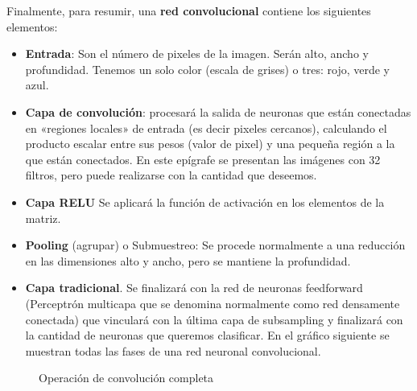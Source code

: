 \documentclass[
  a4paper,
  DIV=11,
  numbers=noendperiod]{scrreprt}
\providecommand{\tightlist}{%
  \setlength{\itemsep}{0pt}\setlength{\parskip}{0pt}}\usepackage{longtable,booktabs,array}
\begin{document}
Finalmente, para resumir, una \textbf{red convolucional} contiene los
siguientes elementos:

\begin{itemize}
\tightlist
\item
  \textbf{Entrada}: Son el número de pixeles de la imagen. Serán alto,
  ancho y profundidad. Tenemos un solo color (escala de grises) o tres:
  rojo, verde y azul.
\item
  \textbf{Capa de convolución}: procesará la salida de neuronas que
  están conectadas en «regiones locales» de entrada (es decir pixeles
  cercanos), calculando el producto escalar entre sus pesos (valor de
  pixel) y una pequeña región a la que están conectados. En este
  epígrafe se presentan las imágenes con 32 filtros, pero puede
  realizarse con la cantidad que deseemos.
\item
  \textbf{Capa RELU} Se aplicará la función de activación en los
  elementos de la matriz.
\item
  \textbf{Pooling} (agrupar) o Submuestreo: Se procede normalmente a una
  reducción en las dimensiones alto y ancho, pero se mantiene la
  profundidad.
\item
  \textbf{Capa tradicional}. Se finalizará con la red de neuronas
  feedforward (Perceptrón multicapa que se denomina normalmente como red
  densamente conectada) que vinculará con la última capa de subsampling
  y finalizará con la cantidad de neuronas que queremos clasificar. En
  el gráfico siguiente se muestran todas las fases de una red neuronal
  convolucional.
\end{itemize}

\begin{figure}


\caption{\label{fig-convolucion-completa}Operación de convolución
completa}

\end{figure}%
\end{document}

